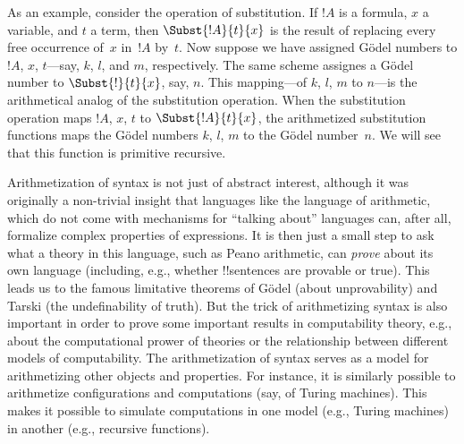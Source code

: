 \documentclass[../../../include/open-logic-section]{subfiles}
\begin{document}
As an example, consider the operation of substitution. If $!A$ is a
formula, $x$ a variable, and $t$ a term, then $\Subst{!A}{t}{x}$ is
the result of replacing every free occurrence of~$x$ in~$!A$ by~$t$.
Now suppose we have assigned G\"odel numbers to $!A$, $x$, $t$---say,
$k$, $l$, and $m$, respectively.  The same scheme assignes a G\"odel
number to $\Subst{!}{t}{x}$, say, $n$.  This mapping---of $k$, $l$,
$m$ to $n$---is the arithmetical analog of the substitution
operation. When the substitution operation maps $!A$, $x$, $t$ to
$\Subst{!A}{t}{x}$, the arithmetized substitution functions maps the
G\"odel numbers $k$, $l$, $m$ to the G\"odel number~$n$.  We will see
that this function is primitive recursive.

Arithmetization of syntax is not just of abstract interest, although
it was originally a non-trivial insight that languages like the
language of arithmetic, which do not come with mechanisms for
``talking about'' languages can, after all, formalize complex
properties of expressions.  It is then just a small step to ask what a
theory in this language, such as Peano arithmetic, can \emph{prove}
about its own language (including, e.g., whether !!{sentence}s are
provable or true).  This leads us to the famous limitative theorems of
G\"odel (about unprovability) and Tarski (the undefinability of
truth). But the trick of arithmetizing syntax is also important in
order to prove some important results in computability theory, e.g.,
about the computational prower of theories or the relationship between
different models of computability.  The arithmetization of syntax
serves as a model for arithmetizing other objects and properties. For
instance, it is similarly possible to arithmetize configurations and
computations (say, of Turing machines). This makes it possible to
simulate computations in one model (e.g., Turing machines) in another
(e.g., recursive functions).
\end{document}
